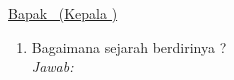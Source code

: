 %
%
%
\begin{spacing}{1.125}
\noindent \underline{Bapak \narsumSatu~(Kepala \lokus)}

\vspace{1cm}

\begin{enumerate}
\setlength{\itemsep}{12pt}%
\item Bagaimana sejarah berdirinya \lokus?\\
\textit{Jawab:} \lipsum[41-49]

\end{enumerate}
\end{spacing}
